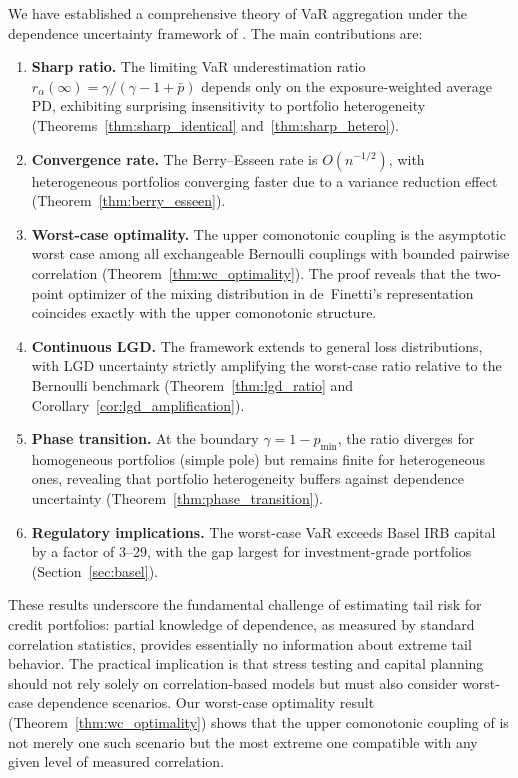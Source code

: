 \documentclass[11pt]{article}
\theoremstyle{definition}
\newcommand{\1}{\mathbf{1}}
\begin{document}
We have established a comprehensive theory of VaR aggregation under the dependence uncertainty framework of \citet{DVNSupper}. The main contributions are:

\begin{enumerate}
  \item \textbf{Sharp ratio.} The limiting VaR underestimation ratio $r_\alpha(\infty) = \gamma/(\gamma - 1 + \bar{p})$ depends only on the exposure-weighted average PD, exhibiting surprising insensitivity to portfolio heterogeneity (Theorems~\ref{thm:sharp_identical} and~\ref{thm:sharp_hetero}).

  \item \textbf{Convergence rate.} The Berry--Esseen rate is $O(n^{-1/2})$, with heterogeneous portfolios converging faster due to a variance reduction effect (Theorem~\ref{thm:berry_esseen}).

  \item \textbf{Worst-case optimality.} The upper comonotonic coupling is the asymptotic worst case among all exchangeable Bernoulli couplings with bounded pairwise correlation (Theorem~\ref{thm:wc_optimality}). The proof reveals that the two-point optimizer of the mixing distribution in de~Finetti's representation coincides exactly with the upper comonotonic structure.

  \item \textbf{Continuous LGD.} The framework extends to general loss distributions, with LGD uncertainty strictly amplifying the worst-case ratio relative to the Bernoulli benchmark (Theorem~\ref{thm:lgd_ratio} and Corollary~\ref{cor:lgd_amplification}).

  \item \textbf{Phase transition.} At the boundary $\gamma = 1 - p_{\min}$, the ratio diverges for homogeneous portfolios (simple pole) but remains finite for heterogeneous ones, revealing that portfolio heterogeneity buffers against dependence uncertainty (Theorem~\ref{thm:phase_transition}).

  \item \textbf{Regulatory implications.} The worst-case VaR exceeds Basel IRB capital by a factor of 3--29, with the gap largest for investment-grade portfolios (Section~\ref{sec:basel}).
\end{enumerate}

These results underscore the fundamental challenge of estimating tail risk for credit portfolios: partial knowledge of dependence, as measured by standard correlation statistics, provides essentially no information about extreme tail behavior. The practical implication is that stress testing and capital planning should not rely solely on correlation-based models but must also consider worst-case dependence scenarios. Our worst-case optimality result (Theorem~\ref{thm:wc_optimality}) shows that the upper comonotonic coupling of \citet{DVNSupper} is not merely one such scenario but the most extreme one compatible with any given level of measured correlation.
\end{document}
